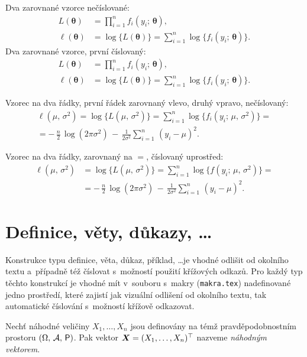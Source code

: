 Dva zarovnané vzorce nečíslované:
\begin{align*}
L(\bm\theta) &= \prod_{i=1}^n f_i(y_i;\,\bm\theta), \\
\ell(\bm\theta) &= \log\bigl\{L(\bm\theta)\bigr\} =
\sum_{i=1}^n \log\bigl\{f_i(y_i;\,\bm\theta)\bigr\}.
\end{align*}
Dva zarovnané vzorce, první číslovaný:
\begin{align}
L(\bm\theta) &= \prod_{i=1}^n f_i(y_i;\,\bm\theta), \label{eq01:L} \\
\ell(\bm\theta) &= \log\bigl\{L(\bm\theta)\bigr\} =
\sum_{i=1}^n \log\bigl\{f_i(y_i;\,\bm\theta)\bigr\}. \nonumber
\end{align}

Vzorec na dva řádky, první řádek zarovnaný vlevo, druhý vpravo, nečíslovaný:
\begin{multline*}
\ell(\mu,\,\sigma^2) = \log\bigl\{L(\mu,\,\sigma^2)\bigr\} =
\sum_{i=1}^n \log\bigl\{f_i(y_i;\,\mu,\,\sigma^2)\bigr\}= \\
  = -\,\frac{n}{2}\,\log(2\pi\sigma^2) \,-\,
\frac{1}{2\sigma^2}\sum_{i=1}^n\,(y_i - \mu)^2.
\end{multline*}

Vzorec na dva řádky, zarovnaný na $=$, číslovaný uprostřed:
\begin{equation}\label{eq01:ell}
\begin{split}
\ell(\mu,\,\sigma^2) &= \log\bigl\{L(\mu,\,\sigma^2)\bigr\} =
\sum_{i=1}^n \log\bigl\{f(y_i;\,\mu,\,\sigma^2)\bigr\}= \\
& = -\,\frac{n}{2}\,\log(2\pi\sigma^2) \,-\,
\frac{1}{2\sigma^2}\sum_{i=1}^n\,(y_i - \mu)^2.
\end{split}
\end{equation}

\section{Definice, věty, důkazy, \dots}

Konstrukce typu definice, věta, důkaz, příklad, \dots je vhodné
odlišit od okolního textu a~případně též číslovat s~možností použití
křížových odkazů. Pro každý typ těchto konstrukcí je vhodné mít
v~souboru s~makry (\texttt{makra.tex}) nadefinované jedno prostředí,
které zajistí jak vizuální odlišení od okolního textu, tak
automatické číslování s~možností křížově odkazovat.

\begin{definice}\label{def01:1}
  Nechť náhodné veličiny $X_1,\dots,X_n$ jsou definovány na témž
  prav\-dě\-po\-dob\-nost\-ním prostoru $(\Omega,\,\mathcal{A},\,\operatorname{\textsf{P}})$. Pak
  vektor $\bm X = (X_1,\dots,X_n)^\top$ nazveme \emph{náhodným
    vektorem}.
\end{definice}

